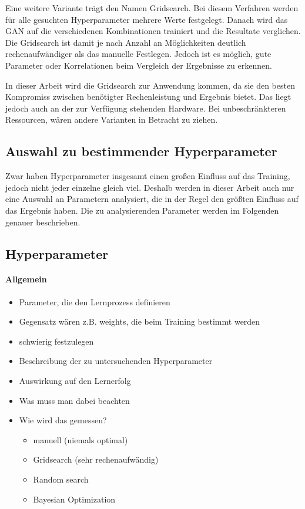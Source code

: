 Eine weitere Variante trägt den Namen Gridsearch.
Bei diesem Verfahren werden für alle gesuchten Hyperparameter mehrere Werte festgelegt.
Danach wird das GAN auf die verschiedenen Kombinationen trainiert und die Resultate verglichen.
Die Gridsearch ist damit je nach Anzahl an Möglichkeiten deutlich rechenaufwändiger als das manuelle Festlegen.
Jedoch ist es möglich, gute Parameter oder Korrelationen beim Vergleich der Ergebnisse zu erkennen.
\newline


In dieser Arbeit wird die Gridsearch zur Anwendung kommen, da sie den besten Kompromiss zwischen benötigter Rechenleistung und Ergebnis bietet.
Das liegt jedoch auch an der zur Verfügung stehenden Hardware.
Bei unbeschränkteren Ressourcen, wären andere Varianten in Betracht zu ziehen.
\newline

\subsection{Auswahl zu bestimmender Hyperparameter}
Zwar haben Hyperparameter insgesamt einen großen Einfluss auf das Training, jedoch nicht jeder einzelne gleich viel.
Deshalb werden in dieser Arbeit auch nur eine Auswahl an Parametern analysiert, die in der Regel  den größten Einfluss auf das Ergebnis haben.
Die zu analysierenden Parameter werden im Folgenden genauer beschrieben.




\subsection{Hyperparameter}
\paragraph{Allgemein \cite{hyperparameters-search-in-machine-learning, hyperparameters-gan-using-genetic-algorithm}}
\begin{itemize}
	\item Parameter, die den Lernprozess definieren
	\item Gegensatz wären z.B. weights, die beim Training bestimmt werden
	\item schwierig festzulegen
	\item Beschreibung der zu untersuchenden Hyperparameter
	\item Auswirkung auf den Lernerfolg
	\item Was muss man dabei beachten
	\item Wie wird das gemessen?
	\begin{itemize}
		\item manuell (niemals optimal)
		\item Gridsearch (sehr rechenaufwändig)  \cite{hyperparameters-grid-search}
		\item Random search
		\item Bayesian Optimization
	\end{itemize}
\end{itemize}

